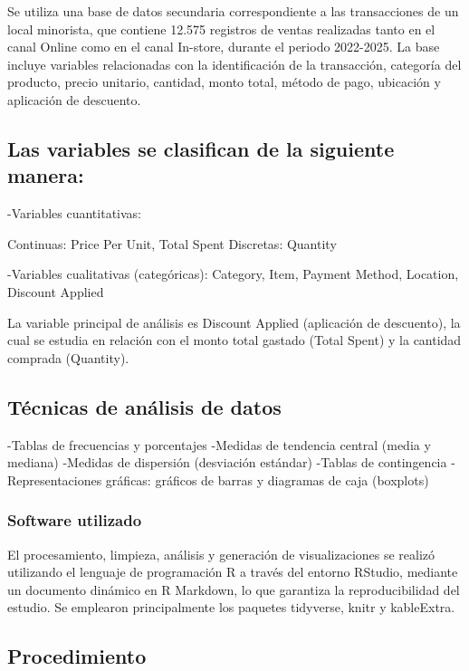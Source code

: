 \documentclass[oneside,11pt]{Latex/Classes/PhDthesisPSnPDF}
\begin{document}
Se utiliza una base de datos secundaria correspondiente a las
transacciones de un local minorista, que contiene 12.575 registros de
ventas realizadas tanto en el canal Online como en el canal In-store,
durante el periodo 2022-2025. La base incluye variables relacionadas con
la identificación de la transacción, categoría del producto, precio
unitario, cantidad, monto total, método de pago, ubicación y aplicación
de descuento.\\

\subsection{Las variables se clasifican de la siguiente manera:}

-Variables cuantitativas:

Continuas: Price Per Unit, Total Spent Discretas: Quantity

-Variables cualitativas (categóricas): Category, Item, Payment Method,
Location, Discount Applied

La variable principal de análisis es Discount Applied (aplicación de
descuento), la cual se estudia en relación con el monto total gastado
(Total Spent) y la cantidad comprada (Quantity).\\

\subsection{Técnicas de análisis de datos}

-Tablas de frecuencias y porcentajes -Medidas de tendencia central
(media y mediana) -Medidas de dispersión (desviación estándar) -Tablas
de contingencia -Representaciones gráficas: gráficos de barras y
diagramas de caja (boxplots)\\

\subsubsection{Software utilizado}

El procesamiento, limpieza, análisis y generación de visualizaciones se
realizó utilizando el lenguaje de programación R a través del entorno
RStudio, mediante un documento dinámico en R Markdown, lo que garantiza
la reproducibilidad del estudio. Se emplearon principalmente los
paquetes tidyverse, knitr y kableExtra.\\

\subsection{Procedimiento}
\end{document}

